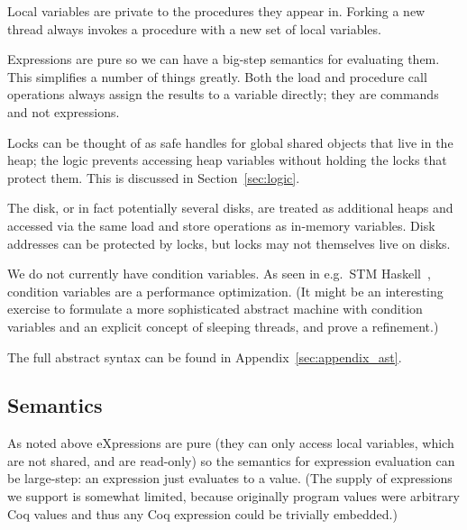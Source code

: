 Local variables are private to the procedures they appear in.
Forking a new thread always invokes a procedure with a new set of
local variables.

Expressions are pure so we can have a big-step semantics for
evaluating them.
This simplifies a number of things greatly.
Both the load and procedure call operations always assign the results
to a variable directly; they are commands and not expressions.

Locks can be thought of as safe handles for global shared objects that
live in the heap; the logic prevents accessing heap variables without
holding the locks that protect them.
This is discussed in Section~\ref{sec:logic}.

The disk, or in fact potentially several disks, are treated as
additional heaps and accessed via the same load and store operations
as in-memory variables.
Disk addresses can be protected by locks, but locks may not themselves
live on disks.

We do not currently have condition variables.
As seen in e.g.\ STM Haskell~\cite{stmhaskell}, condition variables are
a performance optimization.
(It might be an interesting exercise to formulate a more sophisticated
abstract machine with condition variables and an explicit concept of
sleeping threads, and prove a refinement.)

The full abstract syntax can be found in Appendix~\ref{sec:appendix_ast}.

\subsection{Semantics}

As noted above eXpressions are pure (they can only access local
variables, which are not shared, and are read-only) so the
semantics for expression evaluation can be large-step: an expression
just evaluates to a value.
(The supply of expressions we support is somewhat limited, because
originally program values were arbitrary Coq values and thus any Coq
expression could be trivially embedded.)

